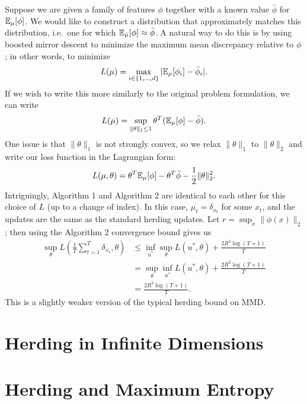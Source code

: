 \documentclass{article}
\begin{document}
Suppose we are given a family of features $\phi$ together 
with a known value $\bar{\phi}$ for $\mathbb{E}_{\mu}[\phi]$. We 
would like to construct a distribution that approximately 
matches this distribution, i.e.~one for which 
$\mathbb{E}_{\hat{\mu}}[\phi] \approx \bar{\phi}$. A natural way 
to do this is by using boosted mirror descent to minimize the 
maximum mean discrepancy relative to $\phi$; 
in other words, to minimize
\[ L(\mu) = \max_{i \in \{1,\dots,d\}} |\mathbb{E}_{\mu}[\phi_i]-\bar{\phi}_i|. \]
If we wish to write this more similarly to the original problem 
formulation, we can write
\[ L(\mu) = \sup_{\|\theta\|_1 \leq 1} \theta^T(\mathbb{E}_{\mu}[\phi]-\bar{\phi}). \]
One issue is that $\|\theta\|_1$ is not strongly convex, so we relax $\|\theta\|_1$ 
to $\|\theta\|_2$ and write our loss function in the Lagrangian form:
\[ L(\mu, \theta) = \theta^T\mathbb{E}_{\mu}[\phi] - \theta^T\bar{\phi} - \frac{1}{2}\|\theta\|_2^2. \]
Intriguingly, Algorithm 1 and Algorithm 2 are identical to each other for this choice of $L$ 
(up to a change of index). In this case, $\mu_t = \delta_{x_t}$ for some $x_t$, and 
the updates are the same as the standard herding updates. Let $r = \sup_{x} \|\phi(x)\|_2$; 
then using the Algorithm 2 convergence bound gives us
\begin{align*}
\sup_{\theta} L\left(\frac{1}{T} \sum_{t=1}^T \delta_{x_t}, \theta\right) &\leq \inf_{u^*} \sup_{\theta} L(u^*, \theta) + \frac{2R^2\log(T+1)}{T} \\
 &= \sup_{\theta} \inf_{u^*} L(u^*, \theta) + \frac{2R^2\log(T+1)}{T} \\
 &= \frac{2R^2\log(T+1)}{T}.
\end{align*}
This is a slightly weaker version of the typical herding bound on MMD.

\section{Herding in Infinite Dimensions}
\label{sec:infinite-case}

\section{Herding and Maximum Entropy}
\label{sec:max-ent}
\end{document}

